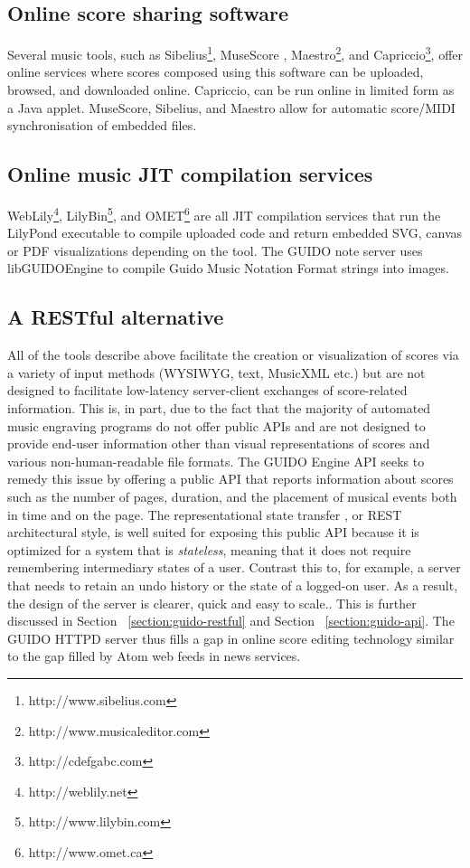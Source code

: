 \documentclass[11pt,a4paper]{article}
\begin{document}
\subsection{Online score sharing software}\label{subsection:sharing}
Several music tools, such as Sibelius\footnote{http://www.sibelius.com}, MuseScore \cite{musescore}, Maestro\footnote{http://www.musicaleditor.com}, and Capriccio\footnote{http://cdefgabc.com}, offer online services where scores composed using this software can be uploaded, browsed, and downloaded online.  Capriccio, can be run online in limited form as a Java applet.  MuseScore, Sibelius, and Maestro allow for automatic score/MIDI synchronisation of embedded files.
\subsection{Online music JIT compilation services}\label{subsection:jit}
WebLily\footnote{http://weblily.net}, LilyBin\footnote{http://www.lilybin.com}, and OMET\footnote{http://www.omet.ca} are all JIT compilation services that run the LilyPond executable to compile uploaded code and return embedded SVG, canvas or PDF visualizations depending on the tool.  The GUIDO note server \cite{renz98} uses libGUIDOEngine to compile Guido Music Notation Format \cite{hoos98} strings into images.
\subsection{A RESTful alternative}\label{subsection:restful}
All of the tools describe above facilitate the creation or visualization of scores via a variety of input methods (WYSIWYG, text, MusicXML etc.) but are not designed to facilitate low-latency server-client exchanges of score-related information.  This is, in part, due to the fact that the majority of automated music engraving programs do not offer public APIs and are not designed to provide end-user information other than visual representations of scores and various non-human-readable file formats.  The GUIDO Engine API \cite{Dau09a} seeks to remedy this issue by offering a public API that reports information about scores such as the number of pages, duration, and the placement of musical events both in time and on the page.  The representational state transfer \cite{Fielding00}, or REST architectural style, is well suited for exposing this public API because it is optimized for a system that is \emph{stateless}, meaning that it does not require remembering intermediary states of a user.  Contrast this to, for example, a server that needs to retain an undo history or the state of a logged-on user.  As a result, the design of the server is clearer, quick and easy to scale.\cite{richardson2008restful}.  This is further discussed in Section ~\ref{section:guido-restful} and Section ~\ref{section:guido-api}.  The GUIDO HTTPD server thus fills a gap in online score editing technology similar to the gap filled by Atom web feeds in news services.
\end{document}
